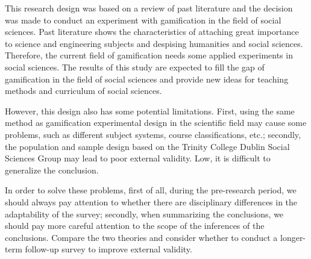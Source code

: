 \documentclass[12pt]{article} %
\begin{document}
\vspace{.5cm}

\noindent This research design was based on a review of past literature and the decision was made to conduct an experiment with gamification in the field of social sciences. Past literature shows the characteristics of attaching great importance to science and engineering subjects and despising humanities and social sciences. Therefore, the current field of gamification needs some applied experiments in social sciences. The results of this study are expected to fill the gap of gamification in the field of social sciences and provide new ideas for teaching methods and curriculum of social sciences.

\noindent However, this design also has some potential limitations. First, using the same method as gamification experimental design in the scientific field may cause some problems, such as different subject systems, course classifications, etc.; secondly, the population and sample design based on the Trinity College Dublin Social Sciences Group may lead to poor external validity. Low, it is difficult to generalize the conclusion.

\noindent In order to solve these problems, first of all, during the pre-research period, we should always pay attention to whether there are disciplinary differences in the adaptability of the survey; secondly, when summarizing the conclusions, we should pay more careful attention to the scope of the inferences of the conclusions. Compare the two theories and consider whether to conduct a longer-term follow-up survey to improve external validity.

\newpage



\end{document}
